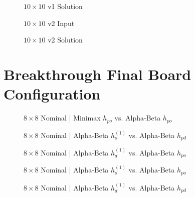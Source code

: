 \documentclass{article}[12pt]
\begin{document}
\begin{appendices}
\begin{figure}[!htb]
	\centering
	\caption{$10 \times 10$ v1 Solution}
\end{figure}
   
   \begin{figure}[!htb]
   	\centering
   	\caption{$10 \times 10$ v2 Input}
   \end{figure}
   
   \begin{figure}[!htb]
   	\centering
   	\caption{$10 \times 10$ v2 Solution}
   \end{figure}
   
   
   \section{Breakthrough Final Board Configuration}
   \label{appendix:bt}
   
   \begin{figure}[!htb]
   	\centering
   	\caption{$8 \times 8$ Nominal | Minimax $h_{po}$ vs. Alpha-Beta $h_{po}$}
   \end{figure}

\begin{figure}[!htb]
	\centering
	\caption{$8 \times 8$ Nominal | Alpha-Beta $h_{o}^{(1)}$ vs. Alpha-Beta $h_{pd}$}
\end{figure}

\begin{figure}[!htb]
	\centering
	\caption{$8 \times 8$ Nominal | Alpha-Beta $h_{d}^{(1)}$ vs. Alpha-Beta $h_{po}$}
\end{figure}

\begin{figure}[!htb]
	\centering
	\caption{$8 \times 8$ Nominal | Alpha-Beta $h_{o}^{(1)}$ vs. Alpha-Beta $h_{po}$}
\end{figure}

\begin{figure}[!htb]
	\centering
	\caption{$8 \times 8$ Nominal | Alpha-Beta $h_{d}^{(1)}$ vs. Alpha-Beta $h_{pd}$}
\end{figure}


\end{appendices}
\end{document}
